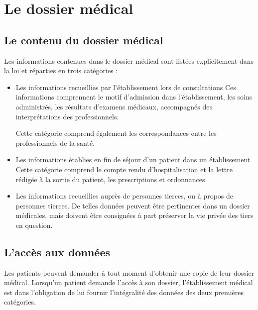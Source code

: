     \section{Le dossier médical}

\subsection{Le contenu du dossier médical}

Les informations contenues dans le dossier médical sont listées explicitement dans la loi et réparties en trois catégories :

\begin{itemize}

\item Les informations recueillies par l'établissement lors de consultations \newline{}
Ces informations comprennent le motif d'admission dans l'établissement, les soins administrés, 
les résultats d'examens médicaux, accompagnés des interprétations des professionnels.

Cette catégorie comprend également les correspondances entre les professionnels de la santé.

\item Les informations établies en fin de séjour d'un patient dans un établissement \newline{}
Cette catégorie comprend le compte rendu d'hospitalisation et la lettre rédigée à la sortie
du patient, les prescriptions et ordonnances.

\item Les informations recueillies auprès de personnes tierces, ou à propos de personnes tierces. \newline{}
De telles données peuvent être pertinentes dans un dossier médicales, mais doivent être
consignées à part préserver la vie privée des tiers en question.

\end{itemize}

\subsection{L'accès aux données}

Les patients peuvent demander à tout moment d'obtenir une copie de leur dossier médical. Lorsqu'un patient demande l'accès à son dossier, l'établissement médical est dans l'obligation
de lui fournir l'intégralité des données des deux premières catégories.

